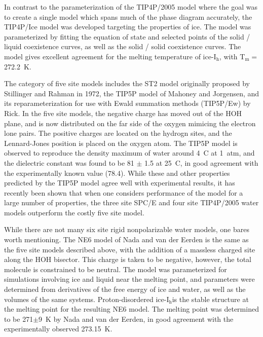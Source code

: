In contrast to the parameterization of the TIP4P/2005 model where the
goal was to create a single model which spans much of the phase
diagram accurately, the TIP4P/Ice model was developed targeting the
properties of ice. The model was parameterized by fitting the equation
of state and selected points of the solid / liquid coexistence curves,
as well as the solid / solid coexistence curves. The model gives
excellent agreement for the melting temperature of ice-I$_\mathrm{h}$,
with T$_\mathrm{m} = $272.2~K. 

The category of five site models includes the ST2 model originally
proposed by Stillinger and Rahman in 1972\cite{Stillinger1974}, the
TIP5P model of Mahoney and Jorgensen\cite{Mahoney2000}, and its
reparameterization for use with Ewald summation methods (TIP5P/Ew) by
Rick.\cite{Rick2004} In the five site models, the negative charge has
moved out of the HOH plane, and is now distributed on the far side of
the oxygen mimicing the electron lone pairs. The positive charges are
located on the hydrogn sites, and the Lennard-Jones position is placed
on the oxygen atom. The TIP5P model is observed to reproduce the
density maximum of water around 4\degrees~C at 1~atm, and the
dielectric constant was found to be 81 $\pm$ 1.5 at 25\degrees~C, in
good agreement with the experimentally known value (78.4). While these
and other properties predicted by the TIP5P model agree well with
experimental results, it has recently been shown that when one
considers performance of the model for a large number of properties,
the three site SPC/E and four site TIP4P/2005 water models outperform
the costly five site model. 

While there are not many six site rigid nonpolarizable water models,
one bares worth mentioning. The NE6 model of Nada and van der Eerden
is the same as the five site models described above, with the addition
of a massless charged site along the HOH bisector.\cite{Nada2003a}
This charge is taken to be negative, however, the total molecule is
constrained to be neutral. The model was parameterized for simulations
involving ice and liquid near the melting point, and parameters were
determined from derivatives of the free energy of ice and water, as
well as the volumes of the same systems. Proton-disordered
ice-I$_\mathrm{h}$is the stable structure at the melting point for the
resulting NE6 model. The melting point was determined to be
271$\pm$9~K by Nada and van der Eerden, in good agreement with the
experimentally observed 273.15~K. 



